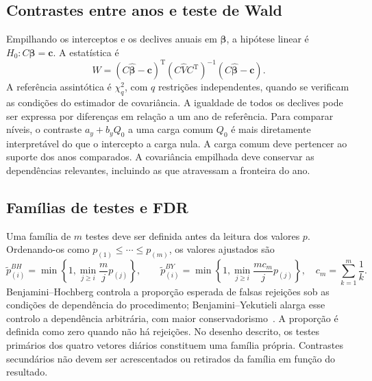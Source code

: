 \subsection{Contrastes entre anos e teste de Wald}
\label{sec:mat-wald}
Empilhando os interceptos e os declives anuais em $\widehat{\boldsymbol\beta}$, a hipótese linear é $H_0:C\boldsymbol\beta=\boldsymbol c$. A estatística é
\begin{equation}
W=(C\widehat{\boldsymbol\beta}-\boldsymbol c)^{\mathrm T}
(C\widehat V C^{\mathrm T})^{-1}
(C\widehat{\boldsymbol\beta}-\boldsymbol c).
\label{eq:mat-wald}
\end{equation}
 A referência assintótica é $\chi^2_q$, com $q$
restrições independentes, quando se verificam as condições do estimador de covariância. A igualdade de todos os declives pode ser expressa por diferenças em relação a um ano de referência. Para comparar níveis, o contraste $a_y+b_yQ_0$ a uma carga comum $Q_0$ é mais diretamente interpretável do que o intercepto a carga nula. A carga comum deve pertencer ao suporte dos anos comparados. A covariância empilhada deve conservar as dependências relevantes, incluindo as que atravessam a fronteira do ano.

\subsection{Famílias de testes e FDR}
\label{sec:mat-fdr}
Uma família de $m$ testes deve ser definida antes da leitura dos valores $p$. Ordenando-os como $p_{(1)}\leq\cdots\leq p_{(m)}$, os valores ajustados são
\begin{equation}
\widetilde p_{(i)}^{BH}=\min\left\{1,\min_{j\geq i}\frac{m}{j}p_{(j)}\right\},
\qquad
\widetilde p_{(i)}^{BY}=\min\left\{1,\min_{j\geq i}\frac{mc_m}{j}p_{(j)}\right\},
\quad c_m=\sum_{k=1}^m\frac1k.
\label{eq:mat-fdr}
\end{equation}
Benjamini--Hochberg controla a proporção esperada de falsas rejeições sob as condições de dependência do procedimento; Benjamini--Yekutieli alarga esse controlo a dependência arbitrária, com maior conservadorismo~\parencite{BenjaminiHochberg1995,BenjaminiYekutieli2001}. A proporção é definida como zero quando não há rejeições. No desenho descrito, os testes primários dos quatro vetores diários constituem uma família própria. Contrastes secundários não devem ser acrescentados ou retirados da família em função do resultado.

